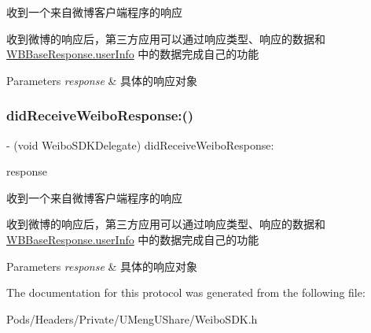 收到一个来自微博客户端程序的响应

收到微博的响应后，第三方应用可以通过响应类型、响应的数据和 \mbox{\hyperlink{interface_w_b_data_transfer_object_ab9b7bf91e1470d29782202c04d1a86fe}{W\+B\+Base\+Response.\+user\+Info}} 中的数据完成自己的功能 
\begin{DoxyParams}{Parameters}
{\em response} & 具体的响应对象 \\
\hline
\end{DoxyParams}
\mbox{\label{protocol_weibo_s_d_k_delegate_01-p_ab644aa5faa87eea8ff974ac274c3c595}} 
\subsubsection{\texorpdfstring{did\+Receive\+Weibo\+Response\+:()}{didReceiveWeiboResponse:()}\hspace{0.1cm}{\footnotesize\ttfamily [3/3]}}
{\footnotesize\ttfamily -\/ (void Weibo\+S\+D\+K\+Delegate) did\+Receive\+Weibo\+Response\+: \begin{DoxyParamCaption}\item[{(\mbox{\hyperlink{interface_w_b_base_response}{W\+B\+Base\+Response}} $\ast$)}]{response }\end{DoxyParamCaption}}

收到一个来自微博客户端程序的响应

收到微博的响应后，第三方应用可以通过响应类型、响应的数据和 \mbox{\hyperlink{interface_w_b_data_transfer_object_ab9b7bf91e1470d29782202c04d1a86fe}{W\+B\+Base\+Response.\+user\+Info}} 中的数据完成自己的功能 
\begin{DoxyParams}{Parameters}
{\em response} & 具体的响应对象 \\
\hline
\end{DoxyParams}


The documentation for this protocol was generated from the following file\+:\begin{DoxyCompactItemize}
\item 
Pods/\+Headers/\+Private/\+U\+Meng\+U\+Share/Weibo\+S\+D\+K.\+h\end{DoxyCompactItemize}
